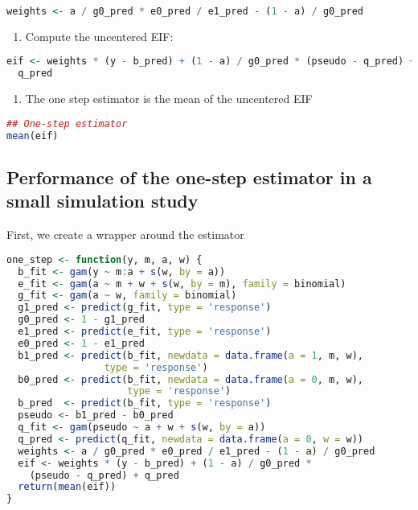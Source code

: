 \documentclass[
  12pt,
]{book}
\providecommand{\tightlist}{%
  \setlength{\itemsep}{0pt}\setlength{\parskip}{0pt}}
\theoremstyle{definition}
\theoremstyle{definition}
\theoremstyle{definition}
\newcommand{\1}{\mathbbm{1}}
\begin{document}
\begin{lstlisting}[language=R]
weights <- a / g0_pred * e0_pred / e1_pred - (1 - a) / g0_pred
\end{lstlisting}

\begin{enumerate}
\def\labelenumi{\arabic{enumi}.}
\setcounter{enumi}{4}
\tightlist
\item
  Compute the uncentered EIF:
\end{enumerate}

\begin{lstlisting}[language=R]
eif <- weights * (y - b_pred) + (1 - a) / g0_pred * (pseudo - q_pred) +
  q_pred
\end{lstlisting}

\begin{enumerate}
\def\labelenumi{\arabic{enumi}.}
\setcounter{enumi}{5}
\tightlist
\item
  The one step estimator is the mean of the uncentered EIF
\end{enumerate}

\begin{lstlisting}[language=R]
## One-step estimator
mean(eif)
\end{lstlisting}

\hypertarget{performance-of-the-one-step-estimator-in-a-small-simulation-study}{%
\subsection{Performance of the one-step estimator in a small simulation study}\label{performance-of-the-one-step-estimator-in-a-small-simulation-study}}

First, we create a wrapper around the estimator

\begin{lstlisting}[language=R]
one_step <- function(y, m, a, w) {
  b_fit <- gam(y ~ m:a + s(w, by = a))
  e_fit <- gam(a ~ m + w + s(w, by = m), family = binomial)
  g_fit <- gam(a ~ w, family = binomial)
  g1_pred <- predict(g_fit, type = 'response')
  g0_pred <- 1 - g1_pred
  e1_pred <- predict(e_fit, type = 'response')
  e0_pred <- 1 - e1_pred
  b1_pred <- predict(b_fit, newdata = data.frame(a = 1, m, w),
                 type = 'response')
  b0_pred <- predict(b_fit, newdata = data.frame(a = 0, m, w),
                     type = 'response')
  b_pred  <- predict(b_fit, type = 'response')
  pseudo <- b1_pred - b0_pred
  q_fit <- gam(pseudo ~ a + w + s(w, by = a))
  q_pred <- predict(q_fit, newdata = data.frame(a = 0, w = w))
  weights <- a / g0_pred * e0_pred / e1_pred - (1 - a) / g0_pred
  eif <- weights * (y - b_pred) + (1 - a) / g0_pred *
    (pseudo - q_pred) + q_pred
  return(mean(eif))
}
\end{lstlisting}
\end{document}
